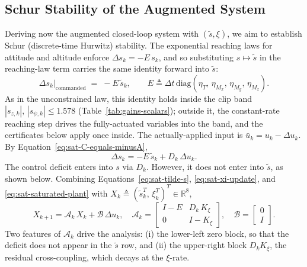 \documentclass[conf]{new-aiaa}
\begin{document}
\subsection{Schur Stability of the Augmented System}
\label{sec:sat-schur}

Deriving now the augmented closed-loop system with $(\tilde s, \xi)$, we aim to establish Schur (discrete-time Hurwitz) stability. The exponential reaching laws for attitude and altitude enforce $\Delta s_k = -E\, s_k$, and so substituting $s \mapsto \tilde s$ in the reaching-law term carries the same identity forward into $\tilde s$:
\begin{equation}
\label{eq:sat-commanded-Ds}
\Delta s_k \big|_{\mathrm{commanded}}
\;=\; -E\, \tilde s_k,
\qquad
E \triangleq \Delta t\, \mathrm{diag}(\eta_T,\, \eta_{M_x},\, \eta_{M_y},\, \eta_{M_z}).
\end{equation}
As in the unconstrained law, this identity holds inside the clip band $|s_{z,k}|,\, |s_{\psi,k}| \leq 1.578$ (Table~\ref{tab:gains-scalars}); outside it, the constant-rate reaching step drives the fully-actuated variables into the band, and the certificates below apply once inside. The actually-applied input is $\bar u_k = u_k - \Delta u_k$. By Equation~\ref{eq:sat-C-equals-minusA},
\begin{equation}
\label{eq:sat-saturated-plant}
\Delta s_k = -E\, \tilde s_k + D_k\, \Delta u_k.
\end{equation}
The control deficit enters into $s$ via $D_k$. However, it does not enter into $\tilde s$, as shown below. Combining Equations~\ref{eq:sat-tilde-s}, \ref{eq:sat-xi-update}, and \ref{eq:sat-saturated-plant} with $X_k \triangleq (\tilde s_k^T,\, \xi_k^T)^T \in \mathbb{R}^8$,
\small
\begin{equation}
\label{eq:sat-closed-loop}
X_{k+1} = \mathcal{A}_k\, X_k + \mathcal{B}\, \Delta u_k,
\quad
\mathcal{A}_k = \begin{bmatrix}
I - E & D_k\, K_\xi \\
0 & I - K_\xi
\end{bmatrix},
\quad
\mathcal{B} = \begin{bmatrix} 0 \\ I \end{bmatrix}.
\end{equation}
\normalsize
Two features of $\mathcal{A}_k$ drive the analysis: (i) the lower-left zero block, so that the deficit does not appear in the $\tilde s$ row, and (ii) the upper-right block $D_k K_\xi$, the residual cross-coupling, which decays at the $\xi$-rate.
\end{document}

